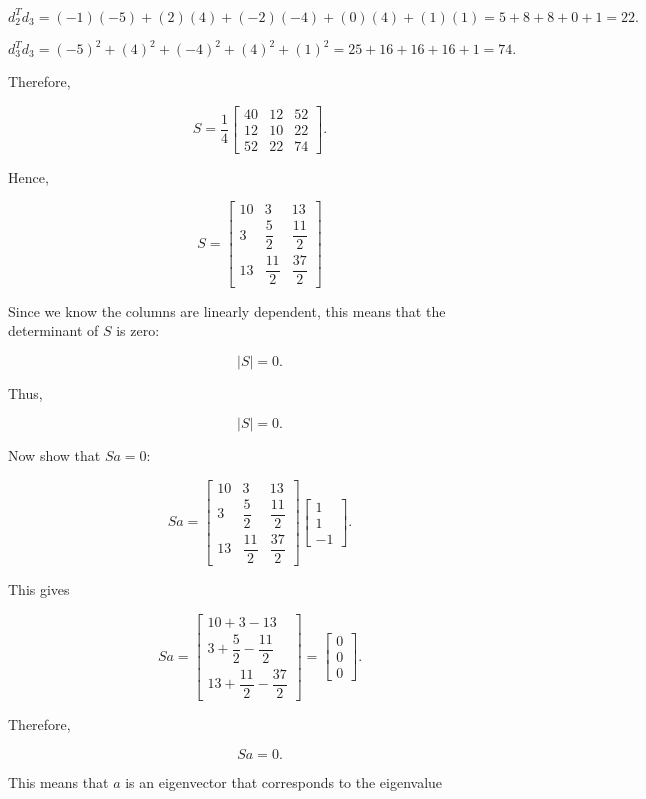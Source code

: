 \documentclass{article}
\begin{document}
$$
d_2^Td_3
=
(-1)(-5)+(2)(4)+(-2)(-4)+(0)(4)+(1)(1)
=
5+8+8+0+1
=
22.
$$

$$
d_3^Td_3
=
(-5)^2+(4)^2+(-4)^2+(4)^2+(1)^2
=
25+16+16+16+1
=
74.
$$

\noindent
Therefore,

$$
S
=
\frac14
\begin{bmatrix}
40&12&52\\
12&10&22\\
52&22&74
\end{bmatrix}.
$$

Hence,

$$
\boxed{
S=
\begin{bmatrix}
10&3&13\\
3&\dfrac52&\dfrac{11}{2}\\
13&\dfrac{11}{2}&\dfrac{37}{2}
\end{bmatrix}}
$$

Since we know the columns are linearly dependent, this means that the determinant of $S$ is
zero:

$$
|S|=0.
$$

Thus,

$$
\boxed{|S|=0}.
$$

Now show that $Sa=0$:

$$
Sa
=
\begin{bmatrix}
10&3&13\\
3&\dfrac52&\dfrac{11}{2}\\
13&\dfrac{11}{2}&\dfrac{37}{2}
\end{bmatrix}
\begin{bmatrix}
1\\
1\\
-1
\end{bmatrix}.
$$

This gives

$$
Sa
=
\begin{bmatrix}
10+3-13\\
3+\dfrac52-\dfrac{11}{2}\\
13+\dfrac{11}{2}-\dfrac{37}{2}
\end{bmatrix}
=
\begin{bmatrix}
0\\
0\\
0
\end{bmatrix}.
$$

Therefore,

$$
\boxed{Sa=0}.
$$

This means that $a$ is an eigenvector that corresponds to the
eigenvalue
\end{document}
